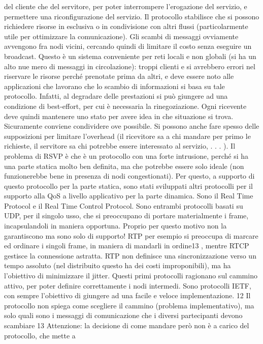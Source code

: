 del cliente che del servitore, per poter interrompere l'erogazione del servizio,
e permettere una riconfigurazione del servizio. Il protocollo stabilisce che si
possono richiedere risorse in esclusiva o in condivisione con altri flussi (particolarmente utile per ottimizzare la
comunicazione). Gli scambi di messaggi
ovviamente avvengono fra nodi vicini, cercando quindi di limitare il costo senza
eseguire un broadcast.
Questo è un sistema conveniente per reti locali e non globali (si ha un alto nue
mero di messaggi in circolazione): troppi clienti e si avrebbero errori nel riservare
le risorse perché prenotate prima da altri, e deve essere noto alle applicazioni
che lavorano che lo scambio di informazioni si basa su tale protocollo. Infatti,
al degradare delle prestazioni si può giungere ad una condizione di best-effort,
per cui è necessaria la rinegoziazione. Ogni ricevente deve quindi mantenere
uno stato per avere idea in che situazione si trova. Sicuramente conviene condividere ove possibile. Si possono anche
fare spesso delle supposizioni per limitare
l'overhead (il ricevitore sa a chi mandare per primo le richieste, il servitore sa
chi potrebbe essere interessato al servizio, . . . ).
Il problema di RSVP è che è un protocollo con una forte intrusione, perché si
ha una parte statica molto ben definita, ma che potrebbe essere solo ideale (non
funzionerebbe bene in presenza di nodi congestionati). Per questo, a supporto
di questo protocollo per la parte statica, sono stati sviluppati altri protocolli
per il supporto alla QoS a livello applicativo per la parte dinamica. Sono il Real
Time Protocol e il Real Time Control Protocol. Sono entrambi protocolli basati
su UDP, per il singolo usso, che si preoccupano di portare materialmente i
frame, incapsulandoli in maniera opportuna. Proprio per questo motivo non
la garantiscono ma sono solo di supporto! RTP per esempio si preoccupa di
marcare ed ordinare i singoli frame, in maniera di mandarli in ordine13 , mentre
RTCP gestisce la connessione astratta.
RTP non definisce una sincronizzazione verso un tempo assoluto (nel distribuito questo ha dei costi improponibili), ma
ha
l'obiettivo di minimizzare il
jitter. Questi primi protocolli ragionano sul cammino attivo, per poter definire
correttamente i nodi intermedi. Sono protocolli IETF, con sempre l'obiettivo di
giungere ad una facile e veloce implementazione.
12 Il protocollo non spiega come scegliere il cammino (problema implementativo), ma solo
quali sono i messaggi di comunicazione che i diversi partecipanti devono scambiare
13 Attenzione: la decisione di come mandare però non è a carico del protocollo, che mette a
